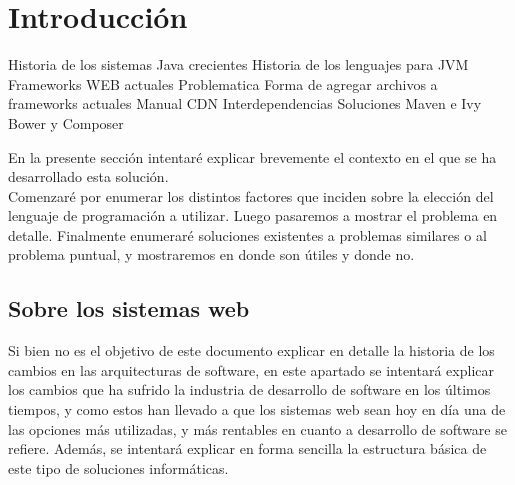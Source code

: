 \section{Introducción}

Historia de los sistemas Java crecientes
Historia de los lenguajes para JVM
Frameworks WEB actuales
Problematica
Forma de agregar archivos a frameworks actuales
Manual
CDN
Interdependencias
Soluciones Maven e Ivy
Bower y Composer

En la presente sección intentaré explicar brevemente el contexto en el que se ha
desarrollado esta solución.\\
Comenzaré por enumerar los distintos factores que inciden sobre la elección del lenguaje
de programación a utilizar. Luego pasaremos a mostrar el problema en detalle. Finalmente
enumeraré soluciones existentes a problemas similares o al problema puntual, y mostraremos
en donde son útiles y donde no.

\subsection{Sobre los sistemas web}

Si bien no es el objetivo de este documento explicar en detalle la historia de los cambios
en las arquitecturas de software, en este apartado se intentará explicar los cambios que ha
sufrido la industria de desarrollo de software en los últimos tiempos, y como estos han
llevado a que los sistemas web sean hoy en día una de las opciones más utilizadas, y más
rentables en cuanto a desarrollo de software se refiere. Además, se intentará explicar en
forma sencilla la estructura básica de este tipo de soluciones informáticas.

